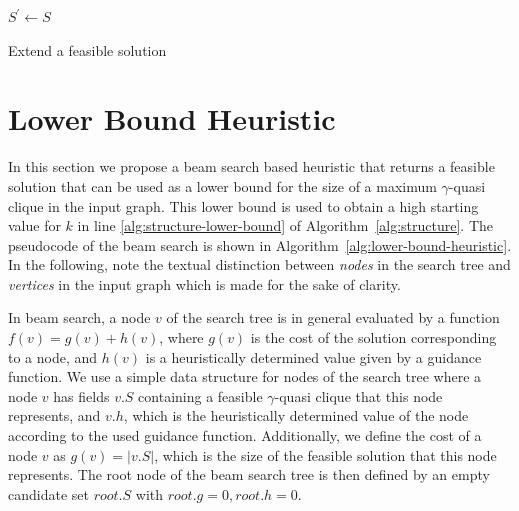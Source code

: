\documentclass[draft,final]{vutinfth} %
\begin{document}
\begin{algorithm}
    \DontPrintSemicolon
    $S^\prime \gets S$ \;
    \caption{Extend a feasible solution}
    \label{alg:extend}
\end{algorithm}

\section{Lower Bound Heuristic}\label{sec:lower-bound-heuristic}

In this section we propose a beam search based heuristic that returns a feasible solution that can be used as a lower bound for the size of a maximum $\gamma$-quasi clique in the input graph. This lower bound is used to obtain a high starting value for $k$ in line \ref{alg:structure-lower-bound} of Algorithm~\ref{alg:structure}. 
The pseudocode of the beam search is shown in Algorithm~\ref{alg:lower-bound-heuristic}. 
In the following, note the textual distinction between \emph{nodes} in the search tree and \emph{vertices} in the input graph which is made for the sake of clarity. 

In beam search, a node $v$ of the search tree is in general evaluated by a function $f(v) = g(v) + h(v)$, where $g(v)$ is the cost of the solution corresponding to a node, and $h(v)$ is a heuristically determined value given by a guidance function. 
We use a simple data structure for nodes of the search tree where a node $v$ has fields $\mathit{v.S}$ containing a feasible $\gamma$-quasi clique that this node represents, and $\mathit{v.h}$, which is the heuristically determined value of the node according to the used guidance function.
Additionally, we define the cost of a node $v$ as $g(v) = |v.S|$, which is the size of the feasible solution that this node represents.  
The root node of the beam search tree is then defined by an empty candidate set $\mathit{root.S}$ with $\mathit{root.g}=0, \mathit{root.h}=0$. 
\end{document}
